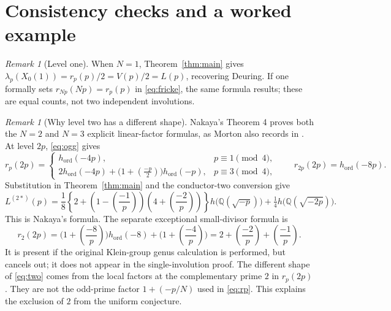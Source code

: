 \documentclass[11pt,a4paper]{article}
\theoremstyle{remark}\newtheorem{remark}[theorem]{Remark}
\numberwithin{equation}{section}
\newcommand{\Q}{\mathbb Q}\newcommand{\Z}{\mathbb Z}
\newcommand{\leg}[2]{\left(\frac{#1}{#2}\right)}
\newcommand{\ho}{h_{\mathrm{ord}}}
\newcommand{\hK}[1]{h\bigl(\Q(\sqrt{-#1})\bigr)}
\begin{document}
\section{Consistency checks and a worked example}\label{sec:examples}
\begin{remark}[Level one]
When $N=1$, Theorem~\ref{thm:main} gives $\lambda_p(X_0(1))=r_p(p)/2=V(p)/2=L(p)$, recovering Deuring. If one formally sets $r_{Np}(Np)=r_p(p)$ in \eqref{eq:fricke}, the same formula results; these are equal counts, not two independent involutions.
\end{remark}

\begin{remark}[Why level two has a different shape]\label{rem:two}
Nakaya's Theorem 4 proves both the $N=2$ and $N=3$ explicit linear-factor formulas, as Morton also records in \cite{MortonFricke}. At level $2p$, \eqref{eq:ogg} gives
\[
r_p(2p)=\begin{cases}
\ho(-4p),&p\equiv1\pmod4,\\
2\ho(-4p)+\bigl(1+\leg{-p}{2}\bigr)\ho(-p),&p\equiv3\pmod4,
\end{cases}
\qquad r_{2p}(2p)=\ho(-8p).
\]
Substitution in Theorem~\ref{thm:main} and the conductor-two conversion give
\begin{equation}\label{eq:two}
L^{(2*)}(p)=\frac18\left\{2+\left(1-\leg{-1}{p}\right)
\left(4+\leg{-2}{p}\right)\right\}\hK{p}
+\tfrac14\hK{2p}.
\end{equation}
This is Nakaya's formula. The separate exceptional small-divisor formula is
\[
r_2(2p)=\bigl(1+\leg{-8}{p}\bigr)\ho(-8)
+\bigl(1+\leg{-4}{p}\bigr)
=2+\leg{-2}{p}+\leg{-1}{p}.
\]
It is present if the original Klein-group genus calculation is performed, but cancels out; it does not appear in the single-involution proof. The different shape of \eqref{eq:two} comes from the local factors at the complementary prime $2$ in $r_p(2p)$. They are not the odd-prime factor $1+(-p/N)$ used in \eqref{eq:rp}. This explains the exclusion of $2$ from the uniform conjecture.
\end{remark}
\end{document}
